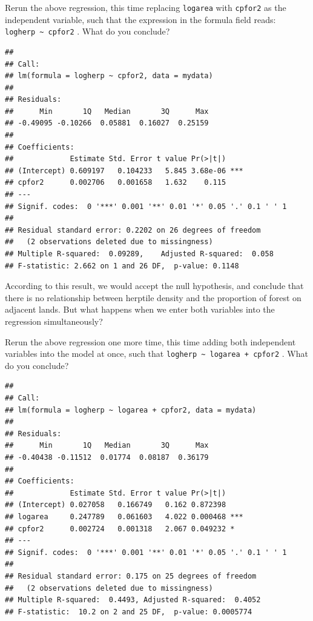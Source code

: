 \documentclass[
  12pt,
]{book}
\makeatletter
\newenvironment{kframe}{%
\medskip{}
\setlength{\fboxsep}{.8em}
\def\at@end@of@kframe{}%
\ifinner\ifhmode%
 \def\at@end@of@kframe{\end{minipage}}%
 \begin{minipage}{\columnwidth}%
\fi\fi%
\def\FrameCommand##1{\hskip\@totalleftmargin \hskip-\fboxsep
\colorbox{incolor}{##1}\hskip-\fboxsep
    \hskip-\linewidth \hskip-\@totalleftmargin \hskip\columnwidth}%
\MakeFramed {\advance\hsize-\width
  \@totalleftmargin\z@ \linewidth\hsize
  \@setminipage}}%
{\par\unskip\endMakeFramed%
\at@end@of@kframe}
\newenvironment{rmdblock}[1]
 {
 \begin{itemize}
 \renewcommand{\labelitemi}{
   \raisebox{-.7\height}[0pt][0pt]{
     {\setkeys{Gin}{width=3em,keepaspectratio}\texttt{[image: images/\#1]}}
   }
 }
 \begin{kframe}
 \setlength{\fboxsep}{1em}
 \item
 }
 {
 \end{kframe}
 \end{itemize}
 }
\newenvironment{rmdcode}
  {\begin{rmdblock}{screen}}
  {\end{rmdblock}}
\makeatother
\begin{document}
\begin{rmdcode}
Rerun the above regression, this time replacing \texttt{logarea} with \texttt{cpfor2} as the independent variable, such that the expression in the formula field reads: \texttt{logherp\ \textasciitilde{}\ cpfor2} . What do you conclude?
\end{rmdcode}

\begin{verbatim}
## 
## Call:
## lm(formula = logherp ~ cpfor2, data = mydata)
## 
## Residuals:
##      Min       1Q   Median       3Q      Max 
## -0.49095 -0.10266  0.05881  0.16027  0.25159 
## 
## Coefficients:
##             Estimate Std. Error t value Pr(>|t|)    
## (Intercept) 0.609197   0.104233   5.845 3.68e-06 ***
## cpfor2      0.002706   0.001658   1.632    0.115    
## ---
## Signif. codes:  0 '***' 0.001 '**' 0.01 '*' 0.05 '.' 0.1 ' ' 1
## 
## Residual standard error: 0.2202 on 26 degrees of freedom
##   (2 observations deleted due to missingness)
## Multiple R-squared:  0.09289,    Adjusted R-squared:  0.058 
## F-statistic: 2.662 on 1 and 26 DF,  p-value: 0.1148
\end{verbatim}

According to this result, we would accept the null hypothesis, and conclude that there is no relationship between herptile density and the proportion of forest on adjacent lands. But what happens when we enter both variables into the regression simultaneously?

\begin{rmdcode}
Rerun the above regression one more time, this time adding both independent variables into the model at once, such that \texttt{logherp\ \textasciitilde{}\ logarea\ +\ cpfor2} . What do you conclude?
\end{rmdcode}

\begin{verbatim}
## 
## Call:
## lm(formula = logherp ~ logarea + cpfor2, data = mydata)
## 
## Residuals:
##      Min       1Q   Median       3Q      Max 
## -0.40438 -0.11512  0.01774  0.08187  0.36179 
## 
## Coefficients:
##             Estimate Std. Error t value Pr(>|t|)    
## (Intercept) 0.027058   0.166749   0.162 0.872398    
## logarea     0.247789   0.061603   4.022 0.000468 ***
## cpfor2      0.002724   0.001318   2.067 0.049232 *  
## ---
## Signif. codes:  0 '***' 0.001 '**' 0.01 '*' 0.05 '.' 0.1 ' ' 1
## 
## Residual standard error: 0.175 on 25 degrees of freedom
##   (2 observations deleted due to missingness)
## Multiple R-squared:  0.4493, Adjusted R-squared:  0.4052 
## F-statistic:  10.2 on 2 and 25 DF,  p-value: 0.0005774
\end{verbatim}
\end{document}
